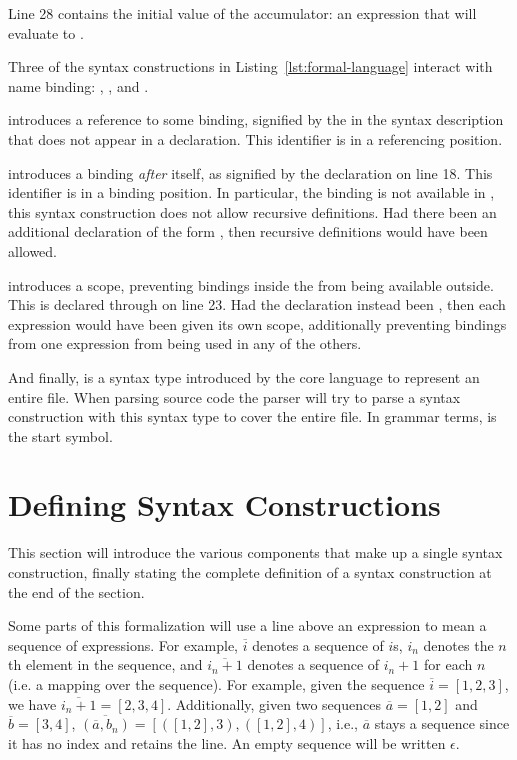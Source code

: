 \documentclass{kththesis}
\begin{document}
Line 28 contains the initial value of the accumulator: an expression that will evaluate to .

Three of the syntax constructions in Listing~\ref{lst:formal-language} interact with name binding: , , and .

 introduces a reference to some binding, signified by the  in the syntax description that does not appear in a  declaration. This identifier is in a referencing position.

 introduces a binding \emph{after} itself, as signified by the  declaration on line 18. This identifier is in a binding position. In particular, the binding is not available in , this syntax construction does not allow recursive definitions. Had there been an additional declaration of the form , then recursive definitions would have been allowed.

 introduces a scope, preventing bindings inside the  from being available outside. This is declared through  on line 23. Had the declaration instead been , then each expression would have been given its own scope, additionally preventing bindings from one expression from being used in any of the others.

And finally,  is a syntax type introduced by the core language to represent an entire file. When parsing source code the parser will try to parse a syntax construction with this syntax type to cover the entire file. In grammar terms,  is the start symbol.

\section{Defining Syntax Constructions} \label{sec:defining-syntax-constructions}

This section will introduce the various components that make up a single syntax construction, finally stating the complete definition of a syntax construction at the end of the section.

Some parts of this formalization will use a line above an expression to mean a sequence of expressions. For example, $\overline{i}$ denotes a sequence of $i$s, $i_n$ denotes the $n$th element in the sequence, and $\overline{i_n + 1}$ denotes a sequence of $i_n + 1$ for each $n$ (i.e. a mapping over the sequence). For example, given the sequence $\overline{i} = [1, 2, 3]$, we have $\overline{i_n + 1} = [2, 3, 4]$. Additionally, given two sequences $\overline{a} = [1, 2]$ and $\overline{b} = [3, 4]$, $\overline{(\overline{a}, b_n)} = [([1, 2], 3), ([1, 2], 4)]$, i.e., $\overline{a}$ stays a sequence since it has no index and retains the line. An empty sequence will be written $\epsilon$.
\end{document}
